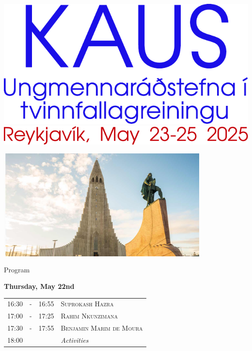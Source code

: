 \documentclass[12pt, openany, twoside]{report}      %
\begin{document}
\begin{titlepage}
    \centering
    \includegraphics[scale = 1.00]{figs/kaus-title} \\
    \vfill
    \vfill
    \includegraphics[scale = 1.00]{figs/kaus-loc}\par\vspace{1cm}
    \vfill
    \vfill
    \includegraphics[width=0.8\textwidth]{figs/hallgrimskirkja}\par\vspace{1cm}
    \vfill
    \vfill
\end{titlepage}

\renewcommand{\arraystretch}{1.2}

\noindent
{\LARGE Program}

\bigskip
\bigskip
\noindent
\textbf{\large Thursday, May 22nd}
\smallskip

\noindent
\begin{tabular}{l@{ } l@{ } l l}
16:30 & - & 16:55 & \textsc{Suprokash Hazra}
\\
17:00 & - & 17:25 & \textsc{Rahim Nkunzimana}
\\
17:30 & - & 17:55 & \textsc{Benjamin Marim de Moura}
\\
18:00 &  &  & \textit{Activities}
\end{tabular}
\end{document}
